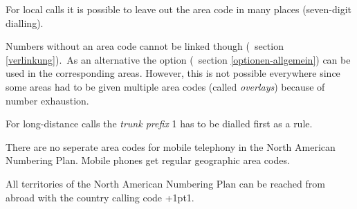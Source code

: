 \documentclass[numbers=noenddot]{scrreprt}
\newcommand{\KeineVerlinkung}{Numbers without an area code cannot be linked though
\vglAbschnitt{verlinkung}.}
\newcommand*{\vglAbschnitt}[1]{(\cf\ section \ref{#1})}
\begin{document}
For local calls it is possible to leave out the area code in many places (seven-digit dialling).
\begin{sidebyside}
\end{sidebyside}
\KeineVerlinkung\ As an alternative the  option
\vglAbschnitt{optionen-allgemein} can be used in the corresponding areas. However, this is not possible everywhere \cite{NANPA-ten-digit} since some areas had to be given multiple area codes (called \emph{overlays}) because of number exhaustion.

For long-distance calls the \emph{trunk prefix} 1 has to be dialled first as a rule.
\begin{sidebyside}
\end{sidebyside}

There are no seperate area codes for mobile telephony in the North American Numbering Plan. Mobile phones get regular geographic area codes.

All territories of the North American Numbering Plan can be reached from abroad with the country calling code +\kern1pt1.
\begin{sidebyside}
\end{sidebyside}
\end{document}
